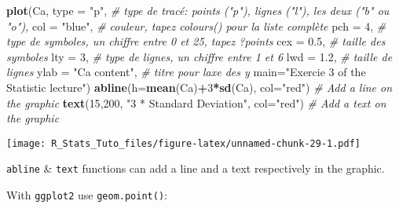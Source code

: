 \documentclass[
]{article}
\newenvironment{Shaded}{\begin{snugshade}}{\end{snugshade}}
\newcommand{\AttributeTok}[1]{\textcolor[rgb]{0.13,0.29,0.53}{#1}}
\newcommand{\CommentTok}[1]{\textcolor[rgb]{0.56,0.35,0.01}{\textit{#1}}}
\newcommand{\DecValTok}[1]{\textcolor[rgb]{0.00,0.00,0.81}{#1}}
\newcommand{\FloatTok}[1]{\textcolor[rgb]{0.00,0.00,0.81}{#1}}
\newcommand{\FunctionTok}[1]{\textcolor[rgb]{0.13,0.29,0.53}{\textbf{#1}}}
\newcommand{\NormalTok}[1]{#1}
\newcommand{\SpecialCharTok}[1]{\textcolor[rgb]{0.81,0.36,0.00}{\textbf{#1}}}
\newcommand{\StringTok}[1]{\textcolor[rgb]{0.31,0.60,0.02}{#1}}
\begin{document}
\begin{Shaded}
\begin{Highlighting}[]
\FunctionTok{plot}\NormalTok{(Ca,  }
  \AttributeTok{type =} \StringTok{"p"}\NormalTok{, }\CommentTok{\# type de tracé: points ("p"), lignes ("l"), les deux ("b" ou "o"),}
  \AttributeTok{col =} \StringTok{"blue"}\NormalTok{, }\CommentTok{\# couleur, tapez \textasciigrave{}colours()\textasciigrave{} pour la liste complète}
  \AttributeTok{pch =} \DecValTok{4}\NormalTok{, }\CommentTok{\# type de symboles, un chiffre entre 0 et 25, tapez \textasciigrave{}?points\textasciigrave{}}
  \AttributeTok{cex =} \FloatTok{0.5}\NormalTok{, }\CommentTok{\# taille des symboles}
  \AttributeTok{lty =} \DecValTok{3}\NormalTok{, }\CommentTok{\# type de lignes, un chiffre entre 1 et 6}
  \AttributeTok{lwd =} \FloatTok{1.2}\NormalTok{, }\CommentTok{\# taille de lignes}
  \AttributeTok{ylab =} \StringTok{"Ca content"}\NormalTok{, }\CommentTok{\# titre pour l\textquotesingle{}axe des y}
  \AttributeTok{main=}\StringTok{"Exercie 3 of the Statistic lecture"}\NormalTok{)}
\FunctionTok{abline}\NormalTok{(}\AttributeTok{h=}\FunctionTok{mean}\NormalTok{(Ca)}\SpecialCharTok{+}\DecValTok{3}\SpecialCharTok{*}\FunctionTok{sd}\NormalTok{(Ca), }\AttributeTok{col=}\StringTok{"red"}\NormalTok{) }\CommentTok{\# Add a line on the graphic}
\FunctionTok{text}\NormalTok{(}\DecValTok{15}\NormalTok{,}\DecValTok{200}\NormalTok{, }\StringTok{"3 * Standard Deviation"}\NormalTok{, }\AttributeTok{col=}\StringTok{"red"}\NormalTok{) }\CommentTok{\# Add a text on the graphic}
\end{Highlighting}
\end{Shaded}

\texttt{[image: R\_Stats\_Tuto\_files/figure-latex/unnamed-chunk-29-1.pdf]}

\texttt{abline} \& \texttt{text} functions can add a line and a text
respectively in the graphic.

With \texttt{ggplot2} use \texttt{geom.point()}:
\end{document}
